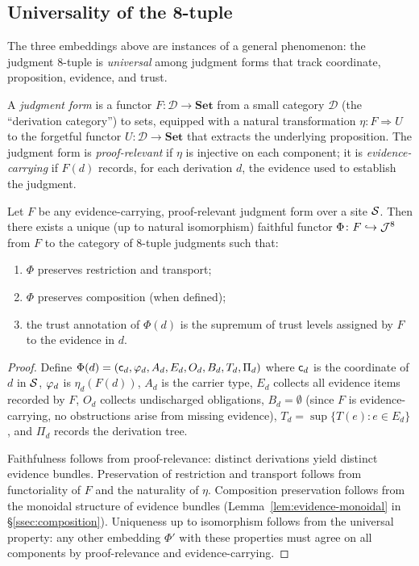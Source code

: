 \documentclass[11pt]{article}
\begin{document}
\subsection{Universality of the 8-tuple}

The three embeddings above are instances of a general phenomenon:
the judgment 8-tuple is \emph{universal} among judgment forms that
track coordinate, proposition, evidence, and trust.

\begin{definition}\label{def:jform}
A \emph{judgment form} is a functor $F \colon \mathcal{D} \to
\mathbf{Set}$ from a small category $\mathcal{D}$ (the ``derivation
category'') to sets, equipped with a natural transformation
$\eta \colon F \Rightarrow U$ to the forgetful functor
$U \colon \mathcal{D} \to \mathbf{Set}$ that extracts the underlying
proposition.  The judgment form is \emph{proof-relevant} if
$\eta$ is injective on each component; it is \emph{evidence-carrying}
if $F(d)$ records, for each derivation $d$, the evidence used to
establish the judgment.
\end{definition}

\begin{theorem}[Universality]\label{thm:universality}
Let $F$ be any evidence-carrying, proof-relevant judgment form over
a site $\mathcal{S}$.  Then there exists a unique (up to natural isomorphism)
faithful functor $\Phi \colon F \hookrightarrow \mathcal{J}^8$ from $F$ to the
category of 8-tuple judgments such that:
\begin{enumerate}[label=(\roman*),nosep]
  \item $\Phi$ preserves restriction and transport;
  \item $\Phi$ preserves composition (when defined);
  \item the trust annotation of $\Phi(d)$ is the supremum of trust
        levels assigned by $F$ to the evidence in $d$.
\end{enumerate}
\end{theorem}

\begin{proof}
Define $\Phi(d) = (\mathsf{c}_d, \varphi_d, A_d, E_d, O_d, B_d, T_d, \Pi_d)$
where $\mathsf{c}_d$ is the coordinate of $d$ in $\mathcal{S}$, $\varphi_d$ is
$\eta_d(F(d))$, $A_d$ is the carrier type, $E_d$ collects all evidence
items recorded by $F$, $O_d$ collects undischarged obligations,
$B_d = \emptyset$ (since $F$ is evidence-carrying, no obstructions arise
from missing evidence), $T_d = \sup \{T(e) : e \in E_d\}$, and
$\Pi_d$ records the derivation tree.

Faithfulness follows from proof-relevance: distinct derivations yield
distinct evidence bundles.  Preservation of restriction and transport
follows from functoriality of $F$ and the naturality of $\eta$.
Composition preservation follows from the monoidal structure of
evidence bundles (Lemma~\ref{lem:evidence-monoidal} in \S\ref{ssec:composition}).
Uniqueness up to isomorphism follows from the universal property: any
other embedding $\Phi'$ with these properties must agree on all
components by proof-relevance and evidence-carrying.
\end{proof}
\end{document}
